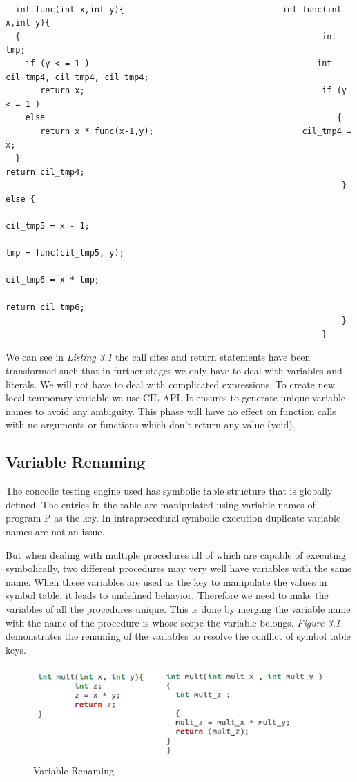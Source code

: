 \documentclass[12pt,oneside]{book}
\begin{document}
\begin{lstlisting}[caption=Expressions simplified]

  int func(int x,int y){								int func(int x,int y){
  {																int tmp;
    if (y < = 1 )											   int cil_tmp4, cil_tmp4, cil_tmp4;
       return x;												if (y < = 1 )
    else														   {
       return x * func(x-1,y);							    cil_tmp4 = x;
  }																    return cil_tmp4;
     															    } else {
																       cil_tmp5 = x - 1;
																       tmp = func(cil_tmp5, y);
																       cil_tmp6 = x * tmp;
																       return cil_tmp6;
																    }
															    }

\end{lstlisting}


We can see in \textit{Listing 3.1} the call sites and return statements have been transformed such that in further stages we only have to deal with variables and literals. We will not have to deal with complicated expressions. To create new local temporary variable we use CIL API. It ensures to generate unique variable names to avoid any ambiguity.
This phase will have no effect on function calls with no arguments or functions which don't return any value (void).
\newpage

\subsection{Variable Renaming}
The concolic testing engine used has symbolic table structure that is globally defined. The entries in the table are manipulated using variable names of program P as the key. In intraprocedural symbolic execution duplicate variable names are not an issue.

But when dealing with multiple procedures all of which are capable of executing symbolically, two different procedures may very well have variables with the same name. When these variables are used as the key to manipulate the values in symbol table, it leads to undefined behavior. Therefore we need to make the variables of all the procedures unique. This is done by merging the variable name with the name of the procedure is whose scope the variable belongs. \textit{Figure 3.1} demonstrates the renaming of the variables to resolve the conflict of symbol table keys. \\

\begin{figure}[htbp]
\centering
\includegraphics[scale=0.45]{renamed1.png}
\caption{Variable Renaming}
\end{figure}  
\end{document}
